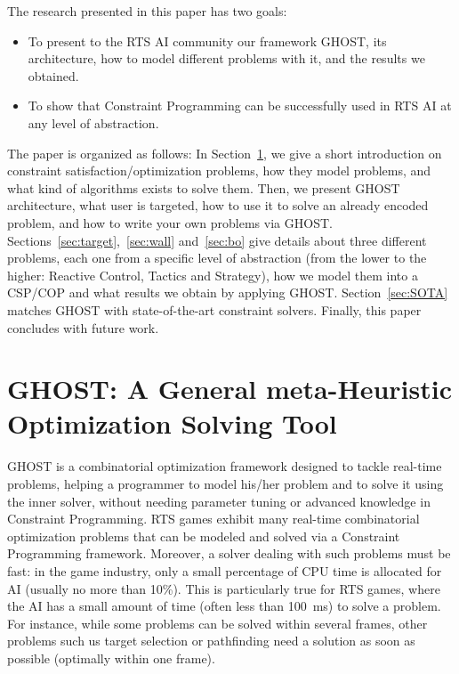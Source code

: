 \documentclass[journal]{IEEEtran}
\newcommand{\minormod}[1]{\color{red} #1\color{black} \xspace}
\newcommand{\csp}{\textsc{CSP}\xspace}
\newcommand{\cop}{\textsc{COP}\xspace}
\newcommand{\ghost}{\textsc{GHOST}\xspace}
\begin{document}
The research presented in this paper has two goals:
\begin{itemize}
\item  To present  to  the RTS  AI community  our  framework \ghost,  its
  architecture,  how  to model  different  problems  with it,  and  the
  results we obtained.
\item To show that Constraint  Programming can be successfully used in
  RTS AI at any level of abstraction.
\end{itemize}

The paper is organized as follows: In Section~\ref{sec:ghost}, we give
a     short     introduction      on     constraint
satisfaction/optimization problems,  how they model problems,  and what
kind  of algorithms  exists to  solve them.   Then, we  present \ghost
architecture, what user is targeted, how  to use it to  solve an already
encoded  problem,  and how  to  write  your  own problems  via  \ghost.
Sections~\ref{sec:target},~\ref{sec:wall}     and~\ref{sec:bo}    give
details about three  different problems, each one from a  specific level of
abstraction (from  the lower to  the higher: Reactive  Control, Tactics
and Strategy), how  we model them into a \csp/\cop  and what results
we obtain by applying  \ghost. Section~\ref{sec:SOTA} matches \ghost
with  state-of-the-art   constraint  solvers.   Finally,   this  paper
concludes with future work.

\section{\ghost:   A  General   meta-Heuristic  Optimization   Solving
  Tool}\label{sec:ghost}

\ghost is a combinatorial  optimization framework designed to tackle real-time problems, helping a programmer to model his/her problem and to solve it using the inner solver, without needing parameter tuning or advanced knowledge in Constraint Programming. RTS games exhibit many real-time combinatorial optimization problems that can be modeled and solved via a Constraint Programming framework. Moreover, a solver dealing with such problems must be fast: in the game industry, only a small percentage of CPU time is allocated for AI (usually no more than 10\%). 
\minormod{This is particularly true for RTS games, where the AI has a small amount of time (often less than 100~ms) to solve a problem. For instance, while some problems can be solved within several frames, other problems such us target selection or pathfinding need a solution as soon as possible (optimally within one frame).}
\end{document}
